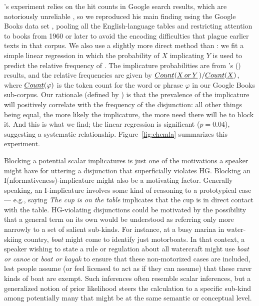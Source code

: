 \documentclass[12pt,twoside]{article}
\newcommand{\Figref}[1]{Figure~\ref{#1}}
\newcommand{\posscitet}[1]{\citeauthor{#1}'s (\citeyear{#1})}
\newcommand{\word}[1]{\emph{#1}}
\renewcommand{\_}{\textbf{\textunderscore\hspace{-4pt}\textunderscore\hspace{-3pt}\textunderscore\hspace{-4pt}\textunderscore}\hspace{0.5pt}}			%
\begin{document}
\citeauthor{Chemla-HurfordCounts}'s experiment relies on the hit
counts in Google search results, which are notoriously unreliable
\citep{Liberman:2005}, so we reproduced his main finding using the
Google Books data set \citep{Michel-etal:2011}, pooling all the
English-language tables and restricting attention to books from 1960
or later to avoid the encoding difficulties that plague earlier texts
in that corpus. We also use a slightly more direct method than
\citeauthor{Chemla-HurfordCounts}: we fit a simple linear regression
in which the probability of $X$ implicating $Y$ is used to predict the
relative frequency of \XorY. The implicature probabilities are
from \posscitet{vanTiel-etal:2013} results, and the relative
frequencies are given by
$\CountGB(\XorY\,)/\CountGB(\word{X\/})$, where
$\emph{Count}(\varphi)$ is the token count for the word or phrase
$\varphi$ in our Google Books sub-corpus. Our rationale (defined by
\citeauthor{Chemla-HurfordCounts}) is that the prevalence of the
implicature will positively correlate with the frequency of the
disjunction: all other things being equal, the more likely the
implicature, the more need there will be to block it. And this is what
we find; the linear regression is significant ($p = 0.04$), suggesting
a systematic relationship. \Figref{fig:chemla} summarizes this
experiment.

Blocking a potential scalar implicatures is just one of the
motivations a speaker might have for uttering a disjunction that
superficially violates HG. Blocking an I(nformativeness)-implicature
\citep{Levinson00} might also be a motivating factor.  Generally
speaking, an I-implicature involves some kind of reasoning to a
prototypical case --- e.g., saying \emph{The cup is on the table}
implicates that the cup is in direct contact with the table.
HG-violating disjunctions could be motivated by the possibility that a
general term on its own would be understood as referring only more
narrowly to a set of salient sub-kinds. For instance,
at a busy marina in water-skiing country, \word{boat} might come to
identify just motorboats. In that context, a speaker wishing to state
a rule or regulation about all watercraft might use \word{boat or
  canoe} or \word{boat or kayak} to ensure that these non-motorized
cases are included, lest people assume (or feel licensed to act as if
they can assume) that these rarer kinds of boat are exempt. Such
inferences often resemble scalar inferences, but a generalized notion
of prior likelihood steers the calculation to a specific sub-kind
among potentially many that might be at the same semantic or
conceptual level.
\end{document}
